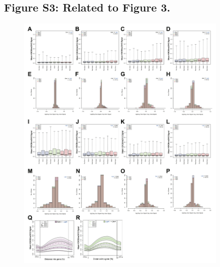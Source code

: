 \documentclass[11pt]{biorxiv}
\begin{document}
\subsection{Figure S3: Related to Figure 3.}
\begin{figure}[ht!]
\center
\includegraphics[width=0.9\textwidth, trim={0in 0in 0in 0in}, clip]{figures/FigS3.png}
\end{figure}
\end{document}
